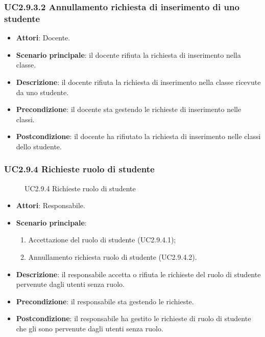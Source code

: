 \subsubsection{UC2.9.3.2 Annullamento richiesta di inserimento di uno studente}
\begin{itemize}
\item \textbf{Attori}: Docente.
\item \textbf{Scenario principale}: il docente rifiuta la richiesta di inserimento nella classe.
\item \textbf{Descrizione}: il docente rifiuta la richiesta di inserimento nella classe ricevute da uno studente.
\item \textbf{Precondizione}: il docente sta gestendo le richieste di inserimento nelle classi.
\item \textbf{Postcondizione}: il docente ha rifiutato la richiesta di inserimento nelle classi dello studente.
\end{itemize}
\subsubsection{UC2.9.4 Richieste ruolo di studente}
\begin{figure}[H]
\centering
\noindent{}
\caption{UC2.9.4 Richieste ruolo di studente}
\end{figure}
\begin{itemize}
\item \textbf{Attori}: Responsabile.
\item \textbf{Scenario principale}:
\begin{enumerate}
\item Accettazione del ruolo di studente (UC2.9.4.1);
\item Annullamento richiesta ruolo di studente (UC2.9.4.2).
\end{enumerate}
\item \textbf{Descrizione}: il responsabile accetta o rifiuta le richieste del ruolo di studente pervenute dagli utenti senza ruolo.
\item \textbf{Precondizione}: il responsabile sta gestendo le richieste.
\item \textbf{Postcondizione}: il responsabile ha gestito le richieste di ruolo di studente che gli sono pervenute dagli utenti senza ruolo.
\end{itemize}
